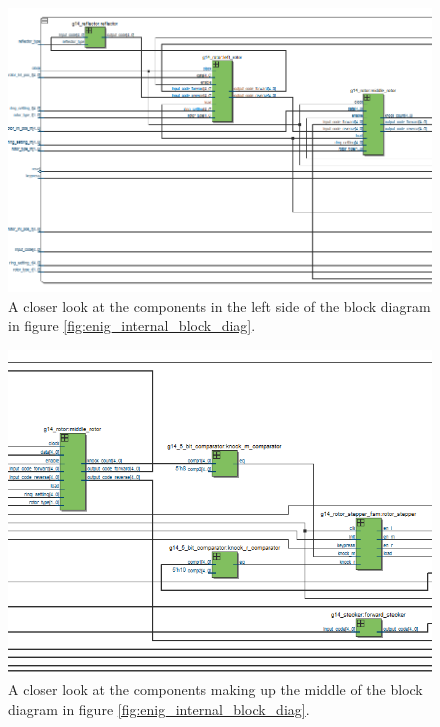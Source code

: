 \documentclass{article}
\begin{document}
\begin{figure}[ht!]
    \centering
    \includegraphics[scale=0.45]{enig_internal_left.PNG}
    \caption{A closer look at the components in the left side of the block diagram in figure \ref{fig:enig_internal_block_diag}.}
    \label{fig:enig_internal_block_diag_left}
\end{figure}


\begin{figure}[ht!]
    \centering
    \includegraphics[scale=0.5]{enig_internal_middle.PNG}
    \caption{A closer look at the components making up the middle of the block diagram in figure \ref{fig:enig_internal_block_diag}.}
    \label{fig:enig_internal_bl_diag_mid}
\end{figure}
\end{document}
